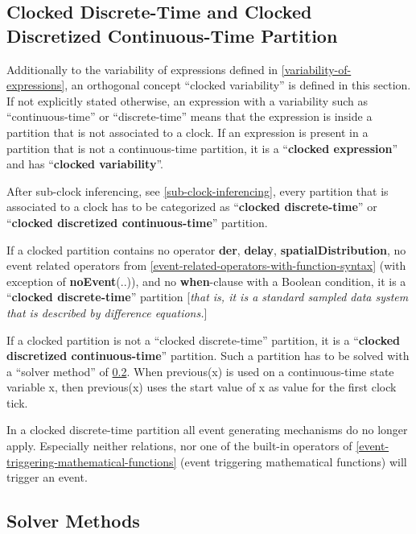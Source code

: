 \documentclass[10pt,a4paper]{report}
\def\doublelabel#1{\label{#1}}
\begin{document}
\subsection{Clocked Discrete-Time and Clocked Discretized Continuous-Time Partition}\doublelabel{clocked-discrete-time-and-clocked-discretized-continuous-time-partition}

Additionally to the variability of expressions defined in \ref{variability-of-expressions},
an orthogonal concept ``clocked variability'' is defined in this
section. If not explicitly stated otherwise, an expression with a
variability such as ``continuous-time'' or ``discrete-time'' means that
the expression is inside a partition that is not associated to a clock.
If an expression is present in a partition that is not a continuous-time
partition, it is a ``\textbf{clocked expression}'' and has
``\textbf{clocked variability}''.

After sub-clock inferencing, see \ref{sub-clock-inferencing}, every partition that is
associated to a clock has to be categorized as ``\textbf{clocked
discrete-time}'' or ``\textbf{clocked discretized continuous-time}''
partition.

If a clocked partition contains no operator \textbf{der},
\textbf{delay}, \textbf{spatialDistribution}, no event related operators
from \ref{event-related-operators-with-function-syntax} (with exception of \textbf{noEvent}(..)), and no
\textbf{when}-clause with a Boolean condition, it is a ``\textbf{clocked
discrete-time}'' partition {[}\emph{that is, it is a standard sampled
data system that is described by difference equations.}{]}

If a clocked partition is not a ``clocked discrete-time'' partition, it
is a ``\textbf{clocked discretized continuous-time}'' partition. Such a
partition has to be solved with a ``solver method'' of \ref{solver-methods}.
When previous(x) is used on a continuous-time state variable x, then
previous(x) uses the start value of x as value for the first clock tick.

In a clocked discrete-time partition all event generating mechanisms do
no longer apply. Especially neither relations, nor one of the built-in
operators of \ref{event-triggering-mathematical-functions} (event triggering mathematical functions)
will trigger an event.

\subsection{Solver Methods}\doublelabel{solver-methods}
\end{document}
